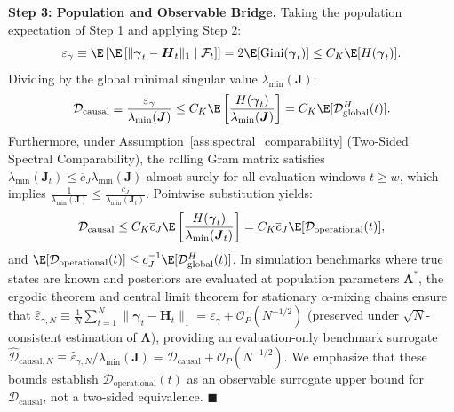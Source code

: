 \textbf{Step 3: Population and Observable Bridge.}
Taking the population expectation of Step 1 and applying Step 2:
\begin{equation}
    \varepsilon_\gamma \equiv \E\left[ \E\left[ \|\boldsymbol{\gamma}_t - \boldsymbol{H}_t\|_1 \;\middle|\; \mathcal{F}_t \right] \right] = 2 \E[\operatorname{Gini}(\boldsymbol{\gamma}_t)] \le C_K \E[H(\boldsymbol{\gamma}_t)].
\end{equation}
Dividing by the global minimal singular value $\lambda_{\min}(\boldsymbol{J})$:
\begin{equation}
    \mathcal{D}_{\mathrm{causal}} \equiv \frac{\varepsilon_\gamma}{\lambda_{\min}(\boldsymbol{J})} \le C_K \E\left[ \frac{H(\boldsymbol{\gamma}_t)}{\lambda_{\min}(\boldsymbol{J})} \right] = C_K \E[\mathcal{D}_{\mathrm{global}}^H(t)].
\end{equation}
Furthermore, under Assumption~\ref{ass:spectral_comparability} (Two-Sided Spectral Comparability), the rolling Gram matrix satisfies $\lambda_{\min}(\boldsymbol{J}_t) \le \overline{c}_J \lambda_{\min}(\boldsymbol{J})$ almost surely for all evaluation windows $t \ge w$, which implies $\frac{1}{\lambda_{\min}(\boldsymbol{J})} \le \frac{\overline{c}_J}{\lambda_{\min}(\boldsymbol{J}_t)}$. Pointwise substitution yields:
\begin{equation}
    \mathcal{D}_{\mathrm{causal}} \le C_K \overline{c}_J \E\left[ \frac{H(\boldsymbol{\gamma}_t)}{\lambda_{\min}(\boldsymbol{J}_t)} \right] = C_K \overline{c}_J \E[\mathcal{D}_{\mathrm{operational}}(t)],
\end{equation}
and $\E[\mathcal{D}_{\mathrm{operational}}(t)] \le \underline{c}_J^{-1} \E[\mathcal{D}_{\mathrm{global}}^H(t)]$. In simulation benchmarks where true states are known and posteriors are evaluated at population parameters $\boldsymbol{\Lambda}^*$, the ergodic theorem and central limit theorem for stationary $\alpha$-mixing chains ensure that $\hat{\varepsilon}_{\gamma, N} \equiv \frac{1}{N}\sum_{t=1}^N \|\boldsymbol{\gamma}_t - \boldsymbol{H}_t\|_1 = \varepsilon_\gamma + \mathcal{O}_P(N^{-1/2})$ (preserved under $\sqrt{N}$-consistent estimation of $\boldsymbol{\Lambda}$), providing an evaluation-only benchmark surrogate $\hat{\mathcal{D}}_{\mathrm{causal}, N} \equiv \hat{\varepsilon}_{\gamma, N}/\lambda_{\min}(\boldsymbol{J}) = \mathcal{D}_{\mathrm{causal}} + \mathcal{O}_P(N^{-1/2})$. We emphasize that these bounds establish $\mathcal{D}_{\mathrm{operational}}(t)$ as an observable surrogate upper bound for $\mathcal{D}_{\mathrm{causal}}$, not a two-sided equivalence. $\blacksquare$

